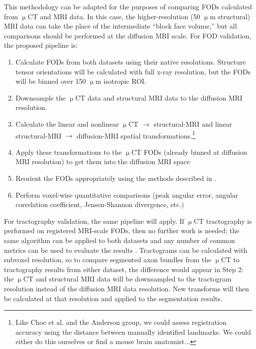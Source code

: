 \documentclass[11pt]{article}
\begin{document}
This methodology can be adapted for the purposes of comparing FODs calculated
from $\upmu$CT and MRI data. In this case, the higher-resolution (50 $\upmu$m
structural) MRI data can take the place of the intermediate ``block face volume,''
but all comparisons should be performed at the diffusion MRI scale. For FOD
validation, the proposed pipeline is:

\begin{enumerate}
\item Calculate FODs from both datasets using their native
  resolutions. Structure tensor orientations will be calculated with full x-ray
  resolution, but the FODs will be binned over 150 $\upmu$m isotropic ROI.
\item Downsample the $\upmu$CT data and structural MRI data to the diffusion MRI resolution.
\item Calculate the linear and nonlinear $\upmu$CT $\rightarrow$ structural-MRI
  and linear structural-MRI $\rightarrow$ diffusion-MRI spatial transformations.\footnote{Like Choe et al. and the Anderson group, we could assess registration accuracy
    using the distance between manually identified landmarks. We could either do this
    ourselves or find a mouse brain anatomist...}
\item Apply these transformations to the $\upmu$CT FODs (already binned at
  diffusion MRI resolution) to get them into the diffusion MRI space
\item Reorient the FODs appropriately using the methods described in \cite{Alexander2001, Hong2009}.
\item Perform voxel-wise quantitative comparisons (peak angular error, angular
  correlation coefficient, Jensen-Shannon divergence, etc.)
\end{enumerate}

For tractography validation, the same pipeline will apply. If $\upmu$CT
tractography is performed on registered MRI-scale FODs, then no further work is
needed; the same algorithm can be applied to both datasets and any number of
common metrics can be used to evaluate the results \cite{Ning2015,Thomas2014}.
Tractograms can be calculated with subvoxel resolution, so to compare segmented
axon bundles from the $\upmu$CT to tractography results from either dataset, the
difference would appear in Step 2: the $\upmu$CT and structural MRI data will be
downsampled to the tractogram resolution instead of the diffusion MRI data
resolution. New transforms will then be calculated at that resolution and applied to
the segmentation results.
\end{document}
